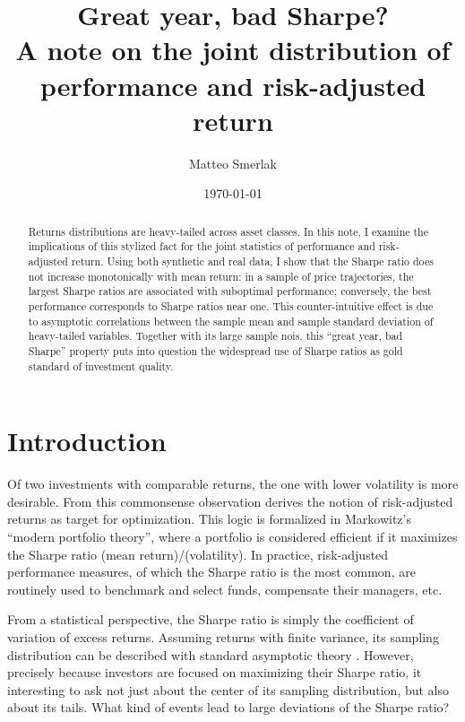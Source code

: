 \documentclass[
reprint,
amsmath,amssymb,
aps,
]{revtex4-2}
\begin{document}
\title{Great year, bad Sharpe?\\ A note on the joint distribution of performance and risk-adjusted return}

\author{Matteo Smerlak}

\date{\today}

\begin{abstract}
    Returns distributions are heavy-tailed across asset classes. 
    In this note, I examine the implications of this stylized fact for the joint statistics of performance and risk-adjusted return. 
    Using both synthetic and real data, I show that the Sharpe ratio does not increase monotonically with mean return: in a sample of price trajectories, the largest Sharpe ratios are associated with suboptimal performance; conversely, the best performance corresponds to Sharpe ratios near one. 
    This counter-intuitive effect is due to asymptotic correlations between the sample mean and sample standard deviation of heavy-tailed variables. 
    Together with its large sample nois, this ``great year, bad Sharpe'' property puts into question the widespread use of Sharpe ratios as gold standard of investment quality. 
 \end{abstract}

\maketitle 

\section{Introduction}

Of two investments with comparable returns, the one with lower volatility is more desirable. 
From this commonsense observation derives the notion of risk-adjusted returns as target for optimization. 
This logic is formalized in Markowitz's ``modern portfolio theory'', where a portfolio is considered efficient if it maximizes the Sharpe ratio (mean return)/(volatility). 
In practice, risk-adjusted performance measures, of which the Sharpe ratio is the most common, are routinely used to benchmark and select funds, compensate their managers, etc.

From a statistical perspective, the Sharpe ratio is simply the coefficient of variation of excess returns. 
Assuming returns with finite variance, its sampling distribution can be described with standard asymptotic theory \cite{loStatistics2002}. 
However, precisely because investors are focused on maximizing their Sharpe ratio, it interesting to ask not just about the center of its sampling distribution, but also about its tails. 
What kind of events lead to large deviations of the Sharpe ratio? 
\end{document}

